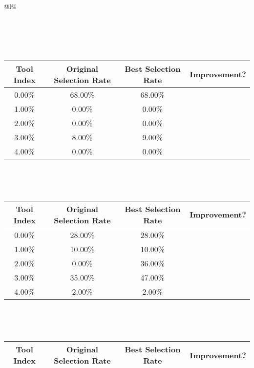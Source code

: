 \begin{longtable}{@{}l@{}}
\begin{minipage}{\textwidth}
\begin{tabular}{|c|c|c|c|}
\end{tabular}
\end{minipage}\\[2ex]
\begin{minipage}{\textwidth}
\noindent{}\\[0.7ex]
\begin{tabular}{|c|c|c|c|} \hline
\textbf{Tool Index} & \textbf{Original Selection Rate} & \textbf{Best Selection Rate} & \textbf{Improvement?} \\ \hline
0.00\% & 68.00\% & 68.00\% & \textcolor{red}{\ding{55}} \\ \hline
1.00\% & 0.00\% & 0.00\% & \textcolor{red}{\ding{55}} \\ \hline
2.00\% & 0.00\% & 0.00\% & \textcolor{red}{\ding{55}} \\ \hline
3.00\% & 8.00\% & 9.00\% & \textcolor{green}{\ding{51}} \\ \hline
4.00\% & 0.00\% & 0.00\% & \textcolor{red}{\ding{55}} \\ \hline
\end{tabular}
\end{minipage}\\[2ex]
\begin{minipage}{\textwidth}
\noindent{}\\[0.7ex]
\begin{tabular}{|c|c|c|c|} \hline
\textbf{Tool Index} & \textbf{Original Selection Rate} & \textbf{Best Selection Rate} & \textbf{Improvement?} \\ \hline
0.00\% & 28.00\% & 28.00\% & \textcolor{red}{\ding{55}} \\ \hline
1.00\% & 10.00\% & 10.00\% & \textcolor{red}{\ding{55}} \\ \hline
2.00\% & 0.00\% & 36.00\% & \textcolor{green}{\ding{51}} \\ \hline
3.00\% & 35.00\% & 47.00\% & \textcolor{green}{\ding{51}} \\ \hline
4.00\% & 2.00\% & 2.00\% & \textcolor{red}{\ding{55}} \\ \hline
\end{tabular}
\end{minipage}\\[2ex]
\begin{minipage}{\textwidth}
\noindent{}\\[0.7ex]
\begin{tabular}{|c|c|c|c|} \hline
\textbf{Tool Index} & \textbf{Original Selection Rate} & \textbf{Best Selection Rate} & \textbf{Improvement?} \\ \hline

\end{tabular}
\end{minipage}
\end{longtable}
